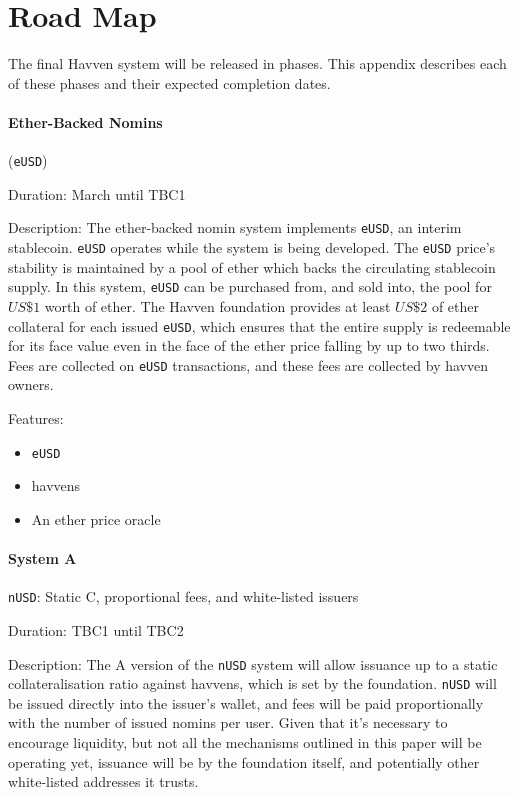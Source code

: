 \section{Road Map}

The final Havven system will be released in phases. This appendix describes
each of these phases and their expected completion dates.

\paragraph{Ether-Backed Nomins} (\texttt{eUSD})

Duration: March until TBC1

Description:
The ether-backed nomin system implements \texttt{eUSD}, an interim stablecoin.
\texttt{eUSD} operates while the system is being developed.
The \texttt{eUSD} price's stability is maintained by a pool of ether which
backs the circulating stablecoin supply. In this system, \texttt{eUSD} can be
purchased from, and sold into, the pool for \(US\$1\) worth of ether.
The Havven foundation provides at least \(US\$2\) of ether collateral for each
issued \texttt{eUSD}, which ensures that the entire supply is redeemable for its
face value even in the face of the ether price falling by up to two thirds.
Fees are collected on \texttt{eUSD} transactions, and these fees are collected
by havven owners.

Features:
\begin{itemize}
    \item{\texttt{eUSD}}
    \item{havvens}
    \item{An ether price oracle}
\end{itemize}


\paragraph{System A} \texttt{nUSD}: Static C, proportional fees, and white-listed issuers

Duration: TBC1 until TBC2

Description:
The A version of the \texttt{nUSD} system will allow issuance up to a static
collateralisation ratio against havvens, which is set by the foundation.
\texttt{nUSD} will be issued directly into the issuer's wallet, and fees will be paid
proportionally with the number of issued nomins per user. Given that it's necessary to
encourage liquidity, but not all the mechanisms outlined in this paper will be operating
yet, issuance will be by the foundation itself, and potentially other white-listed
addresses it trusts.

